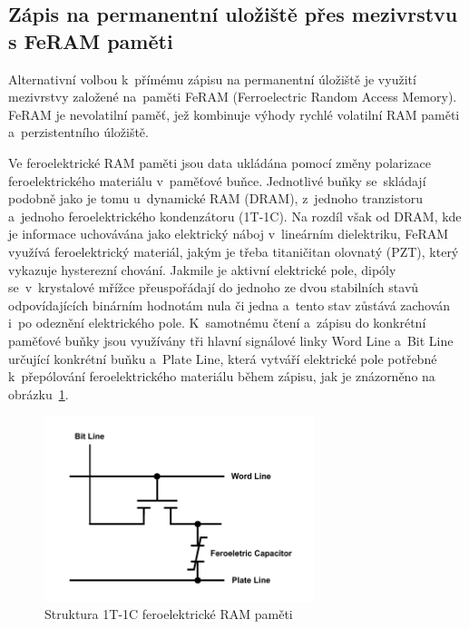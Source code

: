\subsection{Zápis na permanentní uložiště přes mezivrstvu s FeRAM paměti}
\label{feram_ch}
Alternativní volbou k~přímému zápisu na permanentní úložiště je využití mezivrstvy založené na~paměti FeRAM (Ferroelectric Random Access Memory). FeRAM je nevolatilní paměť, jež kombinuje výhody rychlé volatilní RAM paměti a~perzistentního úložiště.

Ve feroelektrické RAM paměti jsou data ukládána pomocí změny polarizace feroelektrického materiálu v~paměťové buňce. Jednotlivé buňky se~skládají podobně jako je tomu u~dynamické RAM (DRAM), z~jednoho tranzistoru a~jednoho feroelektrického kondenzátoru (1T-1C). Na rozdíl však od DRAM, kde je informace uchovávána jako elektrický náboj v~lineárním dielektriku, FeRAM využívá feroelektrický materiál, jakým je třeba titaničitan olovnatý (PZT), který vykazuje hysterezní chování. Jakmile je aktivní elektrické pole, dipóly se~v~krystalové mřížce přeuspořádají do jednoho ze dvou stabilních stavů odpovídajících binárním hodnotám nula či jedna a~tento stav zůstává zachován i~po odeznění elektrického pole. K~samotnému čtení a~zápisu do konkrétní paměťové buňky jsou využívány tři hlavní signálové linky Word Line a~Bit Line určující konkrétní buňku a~Plate Line, která vytváří elektrické pole potřebné k~přepólování feroelektrického materiálu během zápisu, jak je znázorněno na obrázku~\ref{fig:feram-1t-1c}.~\cite{ieee_feram_ultra_high_density_embedded_mem}

\begin{figure}[h]
    \centering
    \includegraphics[width=0.70\textwidth]{obrazky-figures/fram_t1-c1.pdf}
    
    \caption{Struktura 1T-1C feroelektrické RAM paměti~\cite{ieee_feram_ultra_high_density_embedded_mem}}
    \label{fig:feram-1t-1c}
\end{figure}

